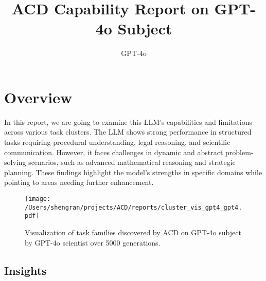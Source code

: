\documentclass[fleqn,10pt]{wlscirep}
\title{ACD Capability Report on GPT-4o Subject}
\author[ ]{GPT-4o}
\begin{document}
\flushbottom
\maketitle
%
%
\thispagestyle{empty}


\setcounter{tocdepth}{2}
\tableofcontents

\newpage

\hypertarget{overview}{%
\section{Overview}\label{overview}}

In this report, we are going to examine this LLM's capabilities and
limitations across various task clusters. The LLM shows strong
performance in structured tasks requiring procedural understanding,
legal reasoning, and scientific communication. However, it faces
challenges in dynamic and abstract problem-solving scenarios, such as
advanced mathematical reasoning and strategic planning. These findings
highlight the model's strengths in specific domains while pointing to
areas needing further enhancement.

\begin{figure}
\hypertarget{fig:cluster}{%
\centering
\texttt{[image: /Users/shengran/projects/ACD/reports/cluster\_vis\_gpt4\_gpt4.pdf]}
\caption{Visualization of task families discovered by ACD on GPT-4o
subject by GPT-4o scientist over 5000 generations.}\label{fig:cluster}
}
\end{figure}

\hypertarget{insights}{%
\subsection{Insights}\label{insights}}
\end{document}
